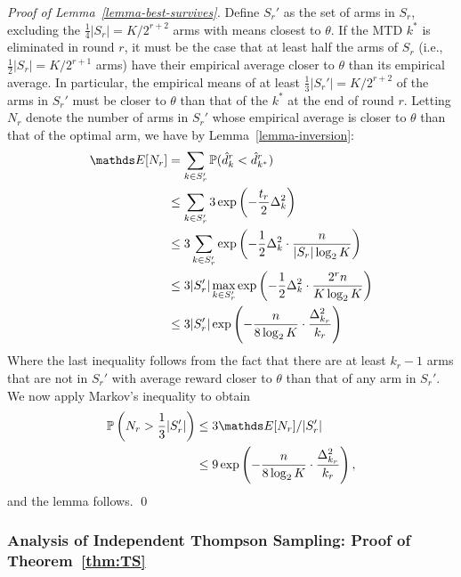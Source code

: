 \begin{proof}[Proof of Lemma~\ref{lemma-best-survives}]
Define $S_r'$ as the set of arms in $S_r$, excluding the
$\frac{1}{4}|S_r| = K/2^{r+2}$ arms with means closest to $\theta$.
If the MTD $k^*$ is eliminated in round $r$,
it must be the case that at least half the arms of $S_r$
(i.e., $\frac{1}{2}|S_r| = K/2^{r+1}$ arms)
have their empirical average closer to $\theta$ than its empirical
average.
In particular, the empirical means of at least
$\frac{1}{3}|S_r'| = K/2^{r+2}$ of the arms in $S_r'$ must be closer to
$\theta$ than that of the $k^*$ at the end of round $r$.
Letting $N_r$ denote the number of arms in $S_r'$ whose empirical average
is closer to $\theta$ than that of the optimal arm, we have by
Lemma~\ref{lemma-inversion}:
\begin{align*}
	\E[N_r] &= \sum_{k \in S_r'}
		\P(\hat d^r_k < \hat d^r_{k^*})
\\
	&\le \sum_{k \in S_r'} 3 \exp\left( -\frac{t_r}{2} \Delta^2_k \right)
\\
	&\le 3 \sum_{k \in S_r'} \exp\left( -\frac{1}{2} \Delta^2_k
		\cdot \frac{n}{|S_r| \log_2 K} \right)
\\
	&\le 3 |S_r'| \max_{k \in S_r'} \exp\left( -\frac{1}{2} \Delta^2_k
		\cdot \frac{2^r n}{K \log_2 K} \right)
\\
	&\le 3 |S_r'| \exp\left( -\frac{n}{8 \log_2 K}
		\cdot \frac{\Delta^2_{k_r}}{k_r} \right)
\end{align*}
Where the last inequality follows from the fact that there are at least
$k_r - 1$ arms that are not in $S_r'$ with average reward closer to $\theta$
than that of any arm in $S_r'$.
We now apply Markov's inequality to obtain
\begin{align*}
\P\left(N_r > \frac{1}{3}|S_r'|\right) &\le 3 \E[N_r] / |S_r'|
\\
	&\le 9 \exp \left(
		- \frac{n}{8 \log_2 K}
		\cdot \frac{\Delta^2_{k_r}}{k_r}
	\right),
\end{align*}
and the lemma follows.
\qed
\end{proof}

\clearpage

\subsubsection{Analysis of Independent Thompson Sampling: Proof of Theorem~\ref{thm:TS}} \label{proof:TS}

